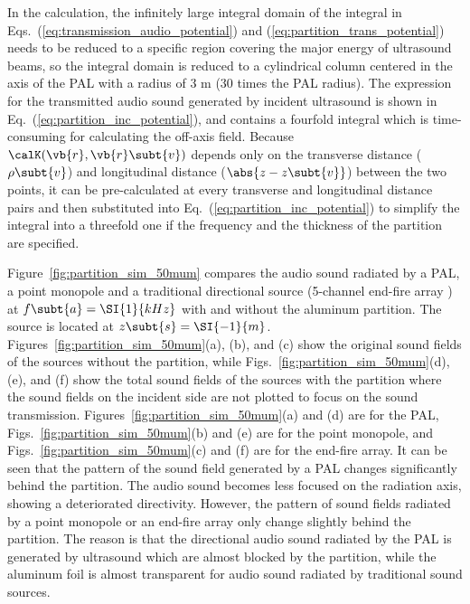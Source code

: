 In the calculation, the infinitely large integral domain of the integral in Eqs.~(\ref{eq:transmission_audio_potential}) and (\ref{eq:partition_trans_potential}) needs to be reduced to a specific region covering the major energy of ultrasound beams, so the integral domain is reduced to a cylindrical column centered in the axis of the PAL with a radius of 3 m (30 times the PAL radius). 
The expression for the transmitted audio sound generated by incident ultrasound is shown in Eq.~(\ref{eq:partition_inc_potential}), and contains a fourfold integral which is time-consuming for calculating the off-axis field. 
Because $\calK(\vb{r},\vb{r}\subt{v})$ depends only on the transverse distance ($\rho\subt{v}$) and longitudinal distance ($\abs{z - z\subt{v}}$) between the two points, it can be pre-calculated at every transverse and longitudinal distance pairs and then substituted into Eq.~(\ref{eq:partition_inc_potential}) to simplify the integral into a threefold one if the frequency and the thickness of the partition are specified.

Figure~\ref{fig:partition_sim_50mum} compares the audio sound radiated by a PAL, a point monopole and a traditional directional source (5-channel end-fire array \cite{Tu2016RobustnessCompactEndfire}) at $f\subt{a} = \SI{1}{kHz}$ with and without the aluminum partition. 
The source is located at $z\subt{s} = \SI{-1}{ m}$. 
Figures~\ref{fig:partition_sim_50mum}(a), (b), and (c) show the original sound fields of the sources without the partition, while Figs.~\ref{fig:partition_sim_50mum}(d), (e), and (f) show the total sound fields of the sources with the partition where the sound fields on the incident side are not plotted to focus on the sound transmission. 
Figures~\ref{fig:partition_sim_50mum}(a) and (d) are for the PAL, Figs.~\ref{fig:partition_sim_50mum}(b) and (e) are for the point monopole, and Figs.~\ref{fig:partition_sim_50mum}(c) and (f) are for the end-fire array. 
It can be {seen} that the pattern of the sound field generated by a PAL changes significantly behind the partition. 
The audio sound becomes less focused on the radiation axis, showing a deteriorated directivity. 
However, the pattern of sound fields radiated by a point monopole or an end-fire array only change slightly behind the partition. 
The reason is that the directional audio sound radiated by the PAL is generated by ultrasound which are almost blocked by the partition, while the aluminum foil is almost transparent for audio sound radiated by traditional sound sources.

